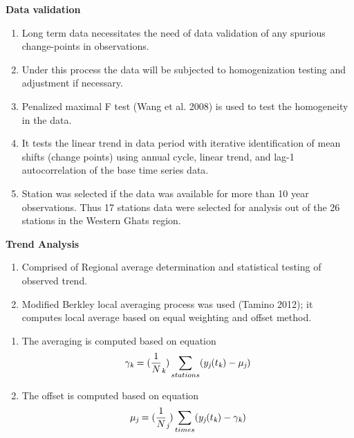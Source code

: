 \documentclass[landscape,final,a0paper,fontscale=0.285]{baposter}
\begin{document}
\begin{poster}
{\begin{multicols}{3}
\noindent\begin{minipage}{\linewidth}
\footnotesize
\textbf{Data validation}
\scriptsize \begin{enumerate}
\item Long term data necessitates the need of data validation of any spurious change-points in observations.
\item Under this process the data will be subjected to homogenization testing and adjustment if necessary.
\item Penalized maximal  F test (Wang et al. 2008) is used to test the homogeneity in the data.
\item It tests the linear trend in data period with iterative identification of mean shifts (change points) using annual cycle, linear trend, and lag-1 autocorrelation of the base time series data. 
\item Station was selected if the data was available for more than 10 year observations.
Thus 17 stations data were selected for analysis out of the 26 stations in the Western Ghats region. 
      \end{enumerate}
\footnotesize\textbf{Trend Analysis}
\scriptsize\begin{enumerate}
      \item Comprised of Regional average determination and statistical testing of observed trend.
      \item Modified Berkley local averaging process was used (Tamino 2012); it computes local average based on equal weighting and offset method.
\end{enumerate}
\end {minipage}
\noindent\begin {minipage}{\linewidth}
\scriptsize
\vspace{5 mm}
      \small \begin{enumerate}
      \scriptsize
      \setcounter{enumi}{2}
      \item The averaging is computed based on equation
      \begin{equation*}  
\gamma _{\textit k}= (\frac{1}{N}_{\textit k}) \sum _{stations}(y_{\textit j}(t_{\textit k}) - \mu _{\textit j})
\end{equation*}
      \item The offset is computed based on equation 
      \begin{equation*}
\mu _{\textit j}= (\frac{1}{N}_{\textit j}) \sum _{times}(y_{\textit j}(t_{\textit k}) - \gamma _{\textit k})
\end{equation*}

\end{enumerate}
\end{minipage}
\end{multicols}}
\end{poster}
\end{document}
